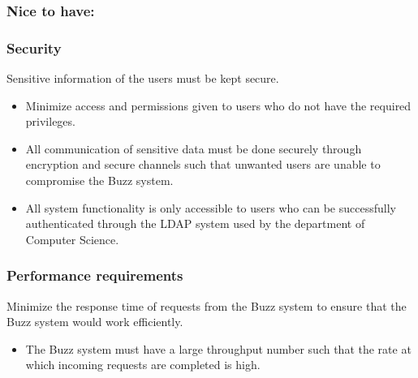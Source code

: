 \documentclass[12pt, oneside]{article}
\begin{document}
	\subsubsection{Nice to have:}
	
	\subsubsection*{Security}
	Sensitive information of the users must be kept secure. 
	\begin{itemize}
		\item Minimize access and permissions given to users who do not have the required privileges.
		\item All communication of sensitive data must be done securely through encryption and secure channels such that unwanted users are unable to compromise the Buzz system.
		\item All system functionality is only accessible to users who can be successfully authenticated through the LDAP system used by the department of Computer Science.
	\end{itemize}		
	
	\subsubsection*{Performance requirements}
	Minimize the response time of requests from the Buzz system to ensure that the Buzz system would work efficiently.
	\begin{itemize}
		\item The Buzz system must have a large throughput number such that the rate at which incoming requests are completed is high.
	\end{itemize}
					
\end{document}
